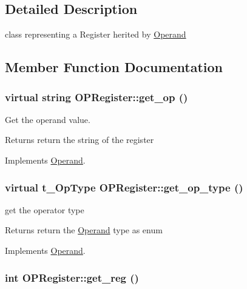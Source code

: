 \subsection{Detailed Description}
class representing a Register herited by \hyperlink{classOperand}{Operand} 

\subsection{Member Function Documentation}
\hypertarget{classOPRegister_a3f9f6cad40b83eee3f88a2e84a0ccffa}{
\subsubsection[{get\_\-op}]{\setlength{\rightskip}{0pt plus 5cm}virtual string OPRegister::get\_\-op ()}}
\label{classOPRegister_a3f9f6cad40b83eee3f88a2e84a0ccffa}


Get the operand value. \begin{DoxyReturn}{Returns}
return the string of the register 
\end{DoxyReturn}


Implements \hyperlink{classOperand_a2bf3ad8b34d39cb35ff743ffcc0f4675}{Operand}.\hypertarget{classOPRegister_a1be03d6e6422510a1fd12d1f13dfd601}{
\subsubsection[{get\_\-op\_\-type}]{\setlength{\rightskip}{0pt plus 5cm}virtual t\_\-OpType OPRegister::get\_\-op\_\-type ()}}
\label{classOPRegister_a1be03d6e6422510a1fd12d1f13dfd601}


get the operator type \begin{DoxyReturn}{Returns}
return the \hyperlink{classOperand}{Operand} type as enum 
\end{DoxyReturn}


Implements \hyperlink{classOperand_afd469e305a467e2574f34ac9bd6c62b0}{Operand}.\hypertarget{classOPRegister_a2e42d6407677a7be154a5d4d74f7a8e7}{
\subsubsection[{get\_\-reg}]{\setlength{\rightskip}{0pt plus 5cm}int OPRegister::get\_\-reg ()}}
\label{classOPRegister_a2e42d6407677a7be154a5d4d74f7a8e7}


